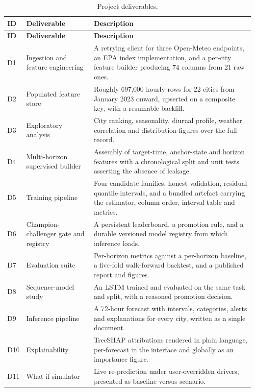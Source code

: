 \begin{xltabular}{\textwidth}{Q{1.3cm} P{4.9cm} Y}
\caption{Project deliverables.}\label{tab:deliverables}\\
\toprule
\bfseries ID & \bfseries Deliverable & \bfseries Description \\
\midrule
\endfirsthead
\toprule
\bfseries ID & \bfseries Deliverable & \bfseries Description \\
\midrule
\endhead
\bottomrule
\endlastfoot
D1 & Ingestion and feature engineering & A retrying client for three Open-Meteo
endpoints, an EPA index implementation, and a per-city feature builder producing
74 columns from 21 raw ones. \\
D2 & Populated feature store & Roughly 697,000 hourly rows for 22 cities from
January 2023 onward, upserted on a composite key, with a resumable backfill. \\
D3 & Exploratory analysis & City ranking, seasonality, diurnal profile, weather
correlation and distribution figures over the full record. \\
D4 & Multi-horizon supervised builder & Assembly of target-time, anchor-state and
horizon features with a chronological split and unit tests asserting the absence
of leakage. \\
D5 & Training pipeline & Four candidate families, honest validation, residual
quantile intervals, and a bundled artefact carrying the estimator, column order,
interval table and metrics. \\
D6 & Champion-challenger gate and registry & A persistent leaderboard, a
promotion rule, and a durable versioned model registry from which inference
loads. \\
D7 & Evaluation suite & Per-horizon metrics against a per-horizon baseline, a
five-fold walk-forward backtest, and a published report and figures. \\
D8 & Sequence-model study & An LSTM trained and evaluated on the same task and
split, with a reasoned promotion decision. \\
D9 & Inference pipeline & A 72-hour forecast with intervals, categories, alerts
and explanations for every city, written as a single document. \\
D10 & Explainability & TreeSHAP attributions rendered in plain language,
per-forecast in the interface and globally as an importance figure. \\
D11 & What-if simulator & Live re-prediction under user-overridden drivers,
presented as baseline versus scenario. \\

\end{xltabular}
